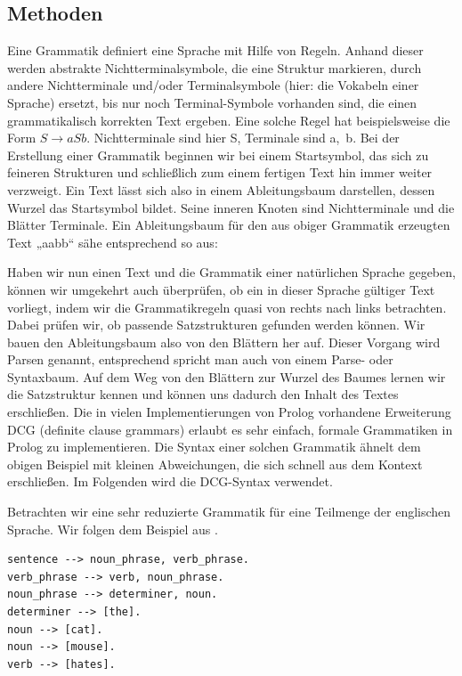\subsection{Methoden}
Eine Grammatik definiert eine Sprache mit Hilfe von Regeln.
Anhand dieser werden abstrakte Nichtterminalsymbole, die eine Struktur markieren, durch andere Nichtterminale und/oder Terminalsymbole (hier: die Vokabeln einer Sprache) ersetzt, bis nur noch Terminal-Symbole vorhanden sind, die einen grammatikalisch korrekten Text ergeben.
Eine solche Regel hat beispielsweise die Form $S \rightarrow a S b$.
Nichtterminale sind hier {S}, Terminale sind {a, b}.
Bei der Erstellung einer Grammatik beginnen wir bei einem Startsymbol, das sich zu feineren Strukturen und schließlich zum einem fertigen Text hin immer weiter verzweigt.
Ein Text lässt sich also in einem Ableitungsbaum darstellen, dessen Wurzel das Startsymbol bildet.
Seine inneren Knoten sind Nichtterminale und die Blätter Terminale.
Ein Ableitungsbaum für den aus obiger Grammatik erzeugten Text „aabb“ sähe entsprechend so aus:

Haben wir nun einen Text und die Grammatik einer natürlichen Sprache gegeben, können wir umgekehrt auch überprüfen, ob ein in dieser Sprache gültiger Text vorliegt, indem wir die Grammatikregeln quasi von rechts nach links betrachten.
Dabei prüfen wir, ob passende Satzstrukturen gefunden werden können.
Wir bauen den Ableitungsbaum also von den Blättern her auf.
Dieser Vorgang wird Parsen genannt, entsprechend spricht man auch von einem Parse- oder Syntaxbaum.
Auf dem Weg von den Blättern zur Wurzel des Baumes lernen wir die Satzstruktur kennen und können uns dadurch den Inhalt des Textes erschließen.
Die in vielen Implementierungen von Prolog vorhandene Erweiterung DCG (definite clause grammars) erlaubt es sehr einfach, formale Grammatiken in Prolog zu implementieren.
Die Syntax einer solchen Grammatik ähnelt dem obigen Beispiel mit kleinen Abweichungen, die sich schnell aus dem Kontext erschließen.
Im Folgenden wird die DCG-Syntax verwendet.

Betrachten wir eine sehr reduzierte Grammatik für eine Teilmenge der englischen Sprache.
Wir folgen dem Beispiel aus \cite[Kapitel 23]{bratko}.

\begin{verbatim}
sentence --> noun_phrase, verb_phrase.
verb_phrase --> verb, noun_phrase.
noun_phrase --> determiner, noun.
determiner --> [the].
noun --> [cat].
noun --> [mouse].
verb --> [hates].
\end{verbatim}

